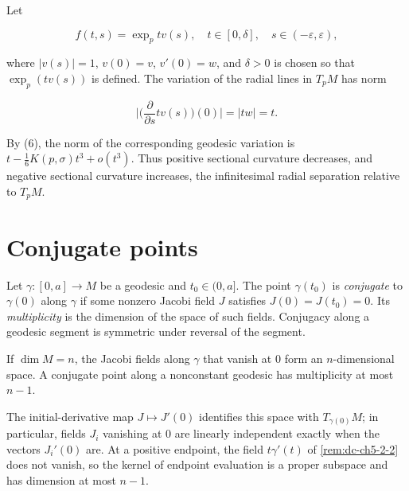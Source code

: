 \begin{remark}
  \label{rem:dc-ch5-2-11}
  Let
  
  $$
  f(t,s)=\exp_p tv(s),\quad t\in[0,\delta],\quad s\in(-\varepsilon,\varepsilon),
  $$
  
  where $|v(s)|=1$, $v(0)=v$, $v'(0)=w$, and $\delta>0$ is chosen so that
  $\exp_p(tv(s))$ is defined. The variation of the radial lines in $T_pM$ has
  norm
  
  $$
  \Big|\Big(\frac{\partial}{\partial s}tv(s)\Big)(0)\Big|=|tw|=t.
  $$
  
  By (6), the norm of the corresponding geodesic variation is
  $t-\frac16K(p,\sigma)t^3+o(t^3)$. Thus positive sectional curvature decreases,
  and negative sectional curvature increases, the infinitesimal radial
  separation relative to $T_pM$.
\end{remark}

\section{Conjugate points}

\begin{definition}
  \label{def:dc-ch5-3-1}
  \leanok
  Let $\gamma:[0,a]\to M$ be a geodesic and $t_0\in(0,a]$. The point
  $\gamma(t_0)$ is \emph{conjugate} to $\gamma(0)$ along $\gamma$ if some
  nonzero Jacobi field $J$ satisfies $J(0)=J(t_0)=0$. Its \emph{multiplicity}
  is the dimension of the space of such fields. Conjugacy along a geodesic
  segment is symmetric under reversal of the segment.
\end{definition}

\begin{remark}
  \label{rem:dc-ch5-3-2}
  \leanok
  If $\dim M=n$, the Jacobi fields along $\gamma$ that vanish at $0$ form an
  $n$-dimensional space. A conjugate point along a nonconstant geodesic has
  multiplicity at most $n-1$.

  \sketch
  The initial-derivative map $J\mapsto J'(0)$ identifies this space with
  $T_{\gamma(0)}M$; in particular, fields $J_i$ vanishing at $0$ are linearly
  independent exactly when the vectors $J_i'(0)$ are. At a positive endpoint,
  the field $t\gamma'(t)$ of \cref{rem:dc-ch5-2-2} does not vanish, so the kernel
  of endpoint evaluation is a proper subspace and has dimension at most $n-1$.
\end{remark}

